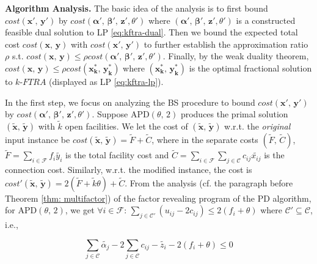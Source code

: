 \documentclass[10pt]{llncs}
\begin{document}
\textbf{Algorithm Analysis. }The basic idea of the analysis is to
first bound $cost\left(\boldsymbol{x'},\,\boldsymbol{y'}\right)$
by $cost\left(\boldsymbol{\alpha'},\,\boldsymbol{\beta'},\,\boldsymbol{z'},\theta'\right)$
where $\left(\boldsymbol{\alpha'},\,\boldsymbol{\beta'},\,\boldsymbol{z'},\theta'\right)$
is a constructed feasible dual solution to LP \eqref{eq:kftra-dual}.
Then we bound the expected total cost $cost\left(\boldsymbol{x},\,\boldsymbol{y}\right)$
with $cost\left(\boldsymbol{x'},\,\boldsymbol{y'}\right)$ to further
establish the approximation ratio $\rho$ s.t. $cost\left(\boldsymbol{x},\,\boldsymbol{y}\right)\leq\rho cost\left(\boldsymbol{\alpha'},\,\boldsymbol{\beta'},\,\boldsymbol{z'},\theta'\right)$.
Finally, by the weak duality theorem, $cost\left(\boldsymbol{x},\,\boldsymbol{y}\right)\leq\rho cost\left(\boldsymbol{x_{k}^{*}},\,\boldsymbol{y_{k}^{*}}\right)$
where $\left(\boldsymbol{x_{k}^{*}},\,\boldsymbol{y_{k}^{*}}\right)$
is the optimal fractional solution to $k$-$FTRA$ (displayed as LP
\eqref{eq:kftra-lp}).

In the first step, we focus on analyzing the BS procedure to bound
$cost\left(\boldsymbol{x'},\,\boldsymbol{y'}\right)$ by $cost\left(\boldsymbol{\alpha'},\,\boldsymbol{\beta'},\,\boldsymbol{z'},\theta'\right)$.
Suppose APD$\left(\theta,\,2\right)$ produces the primal solution
$\left(\boldsymbol{\tilde{x}},\,\boldsymbol{\tilde{y}}\right)$ with
$\tilde{k}$ open facilities. We let the cost of $\left(\boldsymbol{\tilde{x}},\,\boldsymbol{\tilde{y}}\right)$
w.r.t. the \textit{original} input instance be $cost\left(\boldsymbol{\tilde{x}},\,\boldsymbol{\tilde{y}}\right)=\tilde{F}+\tilde{C}$,
where in the separate costs $\left(\tilde{F},\,\tilde{C}\right)$,
$\tilde{F}=\sum_{i\in\mathcal{F}}f_{i}\tilde{y_{i}}$ is the total
facility cost and $\tilde{C}=\sum_{i\in\mathcal{F}}\sum_{j\in\mathcal{C}}c_{ij}\tilde{x_{ij}}$
is the connection cost. Similarly, w.r.t. the modified instance, the
cost is $cost'\left(\boldsymbol{\tilde{x}},\,\boldsymbol{\tilde{y}}\right)=2\left(\tilde{F}+\tilde{k}\theta\right)+\tilde{C}$.
From the analysis (cf. the paragraph before Theorem \ref{thm: multifactor})
of the factor revealing program of the PD algorithm, for APD$\left(\theta,\,2\right)$,
we get $\forall i\in\mathcal{F}:\,\sum_{j\in\mathcal{C}'}\left(u_{ij}-2c_{ij}\right)\leq2\left(f_{i}+\theta\right)$
where $\mathcal{C}'\subseteq\mathcal{C}$, i.e.,

\begin{equation}
\sum_{j\in\mathcal{C}}\tilde{\alpha_{j}}-2\sum_{j\in\mathcal{C}}c_{ij}-\tilde{z_{i}}-2\left(f_{i}+\theta\right)\leq0
\end{equation}
 
\end{document}

